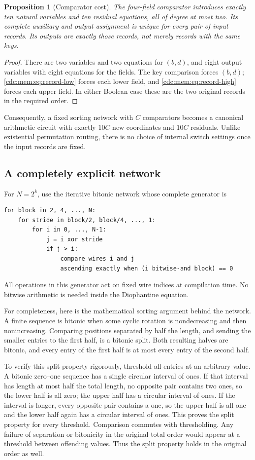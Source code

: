 \documentclass[11pt,a4paper]{article}
\newtheorem{proposition}[proposition]{Proposition}
\theoremstyle{definition}
\theoremstyle{remark}
\begin{document}
\begin{proposition}[Comparator cost]\label{cdc:mem:prop:comparator-cost}
The four-field comparator introduces exactly ten natural variables and ten
residual equations, all of degree at most two. Its complete auxiliary and
output assignment is unique for every pair of input records. Its outputs are
exactly those records, not merely records with the same keys.
\end{proposition}
\begin{proof}
There are two variables and two equations for $(b,d)$, and eight output
variables with eight equations for the fields. The key comparison forces
$(b,d)$; \eqref{cdc:mem:eq:record-low} forces each lower field, and
\eqref{cdc:mem:eq:record-high} forces each upper field. In either Boolean case these
are the two original records in the required order.
\end{proof}

Consequently, a fixed sorting network with $C$ comparators becomes a canonical
arithmetic circuit with exactly $10C$ new coordinates and $10C$ residuals.
Unlike existential permutation routing, there is no choice of internal switch
settings once the input records are fixed.

\subsection{A completely explicit network}\label{cdc:mem:subsec:bitonic}
For $N=2^k$, use the iterative bitonic network whose complete generator is
\begin{lstlisting}
for block in 2, 4, ..., N:
    for stride in block/2, block/4, ..., 1:
        for i in 0, ..., N-1:
            j = i xor stride
            if j > i:
                compare wires i and j
                ascending exactly when (i bitwise-and block) == 0
\end{lstlisting}
All operations in this generator act on fixed wire indices at compilation time.
No bitwise arithmetic is needed inside the Diophantine equation.

For completeness, here is the mathematical sorting argument behind the
network. A finite sequence is bitonic when some cyclic rotation is
nondecreasing and then nonincreasing. Comparing positions separated by half the
length, and sending the smaller entries to the first half, is a bitonic split.
Both resulting halves are bitonic, and every entry of the first half is at most
every entry of the second half.

To verify this split property rigorously, threshold all entries at an arbitrary
value. A bitonic zero--one sequence has a single circular interval of ones. If
that interval has length at most half the total length, no opposite pair
contains two ones, so the lower half is all zero; the upper half has a circular
interval of ones. If the interval is longer, every opposite pair contains a
one, so the upper half is all one and the lower half again has a circular
interval of ones. This proves the split property for every threshold.
Comparison commutes with thresholding. Any failure of separation or bitonicity
in the original total order would appear at a threshold between offending
values. Thus the split property holds in the original order as well.
\end{document}

